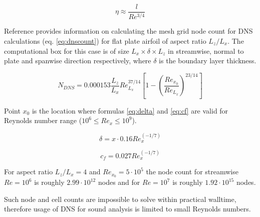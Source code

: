 \begin{equation} \label{eq:kolm}
\eta \approx \frac{l}{Re^{3/4}}
\end{equation}

Reference \citep{LES_size} provides information on calculating the mesh grid node count for DNS calculations (eq. \ref{eq:dnscount}) for flat plate airfoil of aspect ratio $L_z / L_x$. The computational box for this case is of size $L_x \times \delta \times L_z$ in streamwise, normal to plate and spanwise direction respectively, where $\delta$ is the boundary layer thickness.

\begin{equation} \label{eq:dnscount}
N_{DNS} = 0.000153 \frac{L_z}{L_x} Re_{L_x}^{37/14} \left[ 1 - \left( \frac{Re_{x_0}}{Re_{L_x}} \right)^{23/14} \right]
\end{equation}

Point $x_0$ is the location where formulas \ref{eq:delta} and \ref{eq:cf} are valid for Reynolds number range ($10^6 \leq Re_x \leq 10^9$).

\begin{equation} \label{eq:delta}
\delta = x \cdot  0.16 Re_x^{(-1/7)}
\end{equation}

\begin{equation} \label{eq:cf}
c_f = 0.027 Re_x^{(-1/7)}
\end{equation}

For aspect ratio $L_z / L_x = 4$ and $Re_{x_0} = 5 \cdot 10^5$ the node count for streamwise $Re = 10^6$ is roughly $2.99 \cdot 10^{12}$ nodes and for $Re = 10^7$ is roughly $1.92 \cdot 10^{15}$ nodes.

Such node and cell counts are impossible to solve within practical walltime, therefore usage of DNS for sound analysis is limited to small Reynolds numbers.




